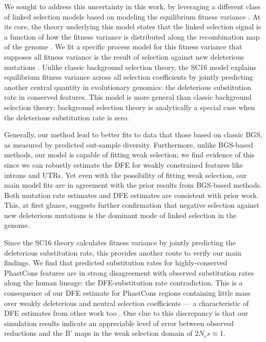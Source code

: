 \documentclass[11pt]{article}
\begin{document}
We sought to address this uncertainty in this work, by leveraging a different
class of linked selection models based on modeling the equilibrium fitness
variance \parencite{Santiago2016-mu}. At its core, the theory underlying this
model states that the linked selection signal is a function of how the fitness
variance is distributed along the recombination map of the genome
\parencite{Santiago1998-bs}. We fit a specific process model for this fitness
variance that supposes all fitness variance is the result of selection against
new deleterious mutations \parencite{Santiago2016-mu}. Unlike classic
background selection theory, the SC16 model explains equilibrium fitness
variance across all selection coefficients by jointly predicting another
central quantity in evolutionary genomics: the deleterious substitution rate in
conserved features. This model is more general than classic background
selection theory; background selection theory is analytically a special case
when the deleterious substitution rate is zero.

Generally, our method lead to better fits to data that those based on classic
BGS, as measured by predicted out-sample diversity. Furthermore, unlike
BGS-based methods, our model is capable of fitting weak selection; we find
evidence of this since we can robustly estimate the DFE for weakly constrained
features like introns and UTRs. Yet even with the possibility of fitting weak
selection, our main model fits are in agreement with the prior results from
BGS-based methods. Both mutation rate estimates and DFE estimates are
consistent with prior work. This, at first glance, suggests further
confirmation that negative selection against new deleterious mutations is the
dominant mode of linked selection in the genome.

Since the SC16 theory calculates fitness variance by jointly predicting the
deleterious substitution rate, this provides another route to verify our main
findings. We find that predicted substitution rates for highly-conserved
PhastCons features are in strong disagreement with observed substitution rates
along the human lineage: the DFE-substitution rate contradiction. This is a
consequence of our DFE estimate for PhastCons regions containing little mass
over weakly deleterious and neutral selection coefficients --- a characteristic
of DFE estimates from other work too \parencite{Murphy2022-sj}. One clue to
this discrepancy is that our simulation results indicate an appreciable level
of error between observed reductions and the B' maps in the weak selection
domain of $2N_e s \approx 1$.
\end{document}
